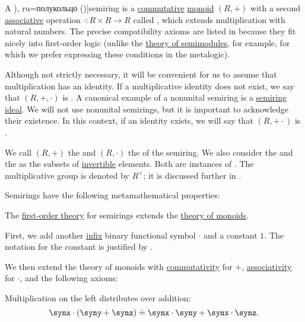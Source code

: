 \begin{definition}\label{def:semiring}
  A \term[ru=полупръстен (\cite[372]{ГеновМиховскиМоллов1991Алгебра}), ru=полукольцо (\cite[4]{ВечтомовПетров2022Полукольца})]{semiring} is a \hyperref[def:binary_operation/commutative]{commutative} \hyperref[def:monoid]{monoid} \( (R, +) \) with a second \hyperref[def:binary_operation/associative]{associative} operation \( \cdot: R \times R \to R \) called , which extends multiplication with natural numbers. The precise compatibility axioms are listed in  because they fit nicely into first-order logic (unlike the \hyperref[def:semimodule/theory]{theory of semimodules}, for example, for which we prefer expressing these conditions in the metalogic).

  Although not strictly necessary, it will be convenient for us to assume that multiplication has an identity. If a multiplicative identity does not exist, we say that \( (R, +, \cdot) \) is . A canonical example of a nonunital semiring is a \hyperref[def:semiring_ideal]{semiring ideal}. We will not use nonunital semirings, but it is important to acknowledge their existence. In this context, if an identity exists, we will say that \( (R, + \cdot) \) is .

  We call \( (R, +) \) the  and \( (R, \cdot) \) the  of the semiring. We also consider the  and the  as the subsets of \hyperref[def:monoid_inverse]{invertible} elements. Both are instances of . The multiplicative group is denoted by \( R^\times \); it is discussed further in .

  Semirings have the following metamathematical properties:
  \begin{thmenum}
    \mimprovised The \hyperref[def:first_order_theory]{first-order theory} for semirings extends the \hyperref[def:monoid/theory]{theory of monoids}.

    First, we add another \hyperref[rem:first_order_formula_conventions/infix]{infix} binary functional symbol \( \cdot \) and a constant \( 1 \). The notation for the constant is justified by .

    We then extend the theory of monoids with \hyperref[def:binary_operation/commutative]{commutativity} for \( + \), \hyperref[def:binary_operation/associative]{associativity} for \( \cdot \), and the following axioms:
    \begin{thmenum}
       Multiplication on the left distributes over addition:
      \begin{equation}\label{eq:def:semiring/left_distributivity}
        \synx \cdot (\syny + \synz) \syneq \synx \cdot \syny + \synx \cdot \synz.
      \end{equation}


\end{thmenum}
\end{thmenum}
\end{definition}

